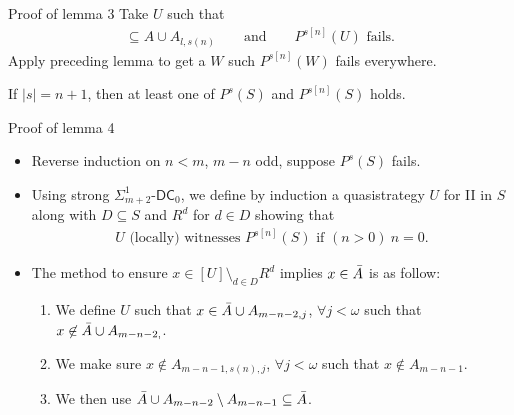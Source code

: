 \documentclass{beamer} %
\begin{document}

\begin{frame}{Proof of lemma 3}
    Take $U$ such that
    \begin{align*}
        [U] \subseteq A \cup A_{l, s(n)} \qquad \text{and} \qquad 
        P^{s[n]}(U) \text{ fails}.
    \end{align*}
    \pause
    Apply preceding lemma to get a $W$ such $P^{s[n]}(W)$ fails everywhere.
\end{frame}


\begin{frame}
    \begin{lemma}[4]
        If $|s| = n+1$, then at least one of $P^s(S)$ and $P^{s[n]}(S)$ holds.\label{binary}
    \end{lemma}
\end{frame}


\begin{frame}{Proof of lemma 4}
    \begin{itemize}
        \item<1-> Reverse induction on $n < m$, $m-n$ odd, suppose $P^s(S)$ fails. 
        \item<2-> Using strong $\Sigma^1_{m+2}$-$\mathsf{DC}_0$, we define by induction a quasistrategy 
        $U$ for II in $S$ along with $D \subseteq S$ and $R^d$ for $d \in D$ showing that \begin{align*}
            U \text{ (locally) witnesses } P^{s[n]}(S) \text{ if } (n > 0) \ n=0.
        \end{align*}
        \item<3-> The method to ensure $x \in [U] \setminus_{d \in D} R^d$ implies $x \in \Bar{A}$ is as 
        follow: \begin{enumerate}
            \item<4-> We define $U$ such that $x \in \Bar{A} \cup A_{m-n-2, j}$, $\forall j < \omega$ such that 
            $x \not\in \Bar{A} \cup A_{m-n-2, }$.
            \item<5-> We make sure $x \not \in A_{m-n-1,s(n),j}$, $\forall j < \omega$ such that
            $x \not \in A_{m-n-1}$.
            \item<6-> We then use $\Bar{A} \cup A_{m-n-2} \setminus A_{m-n-1} \subseteq \Bar{A}$.
        \end{enumerate}
    \end{itemize} 
\end{frame}
\end{document}
